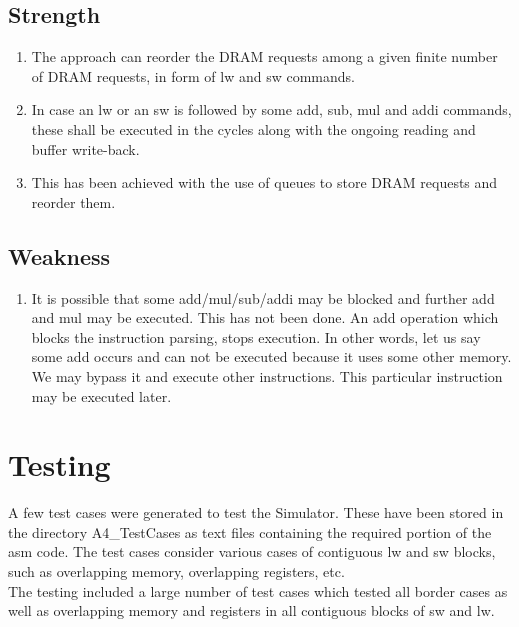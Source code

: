 \documentclass{article} %
\begin{document}
\subsection{Strength}
\begin{enumerate}
    \item The approach can reorder the DRAM requests among a given finite number of DRAM requests, in form of lw and sw commands.
    \item In case an lw or an sw is followed by some add, sub, mul and addi commands, these shall be executed in the cycles along with the ongoing reading and buffer write-back.
    \item This has been achieved with the use of queues to store DRAM requests and reorder them.
\end{enumerate}
\subsection{Weakness}
\begin{enumerate}
    \item It is possible that some add/mul/sub/addi may be blocked and further add and mul may be executed. This has not been done. An add operation which blocks the instruction parsing, stops execution. In other words, let us say some add occurs and can not be executed because it uses some other memory. We may bypass it and execute other instructions. This particular instruction may be executed later.
\end{enumerate}

\section{Testing}
A few test cases were generated to test the Simulator. These have been stored in the directory A4\_TestCases as text files containing the required portion of the asm code. The test cases consider various cases of contiguous lw and sw blocks, such as overlapping memory, overlapping registers, etc.
\\The testing included a large number of test cases which tested all border cases as well as overlapping memory and registers in all contiguous blocks of sw and lw.
\end{document}
